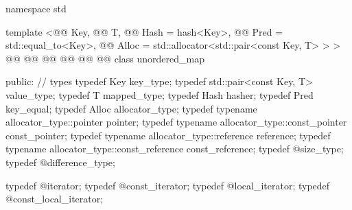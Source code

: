 \documentclass[american,twoside]{book}
\begin{document}
%
\begin{codeblock}
namespace std {
  template <@@ Key,
            @@ T,
            @@ Hash = hash<Key>,
            @@ Pred = std::equal_to<Key>,
            @@ Alloc = std::allocator<std::pair<const Key, T> > >
  @@
           @@
           @@
           @@
           @@
           @@
  class unordered_map
  {
  public:
    // types
    typedef Key                                      key_type;
    typedef std::pair<const Key, T>                  value_type;
    typedef T                                        mapped_type;
    typedef Hash                                     hasher;
    typedef Pred                                     key_equal;
    typedef Alloc                                    allocator_type;
    typedef typename allocator_type::pointer         pointer;
    typedef typename allocator_type::const_pointer   const_pointer;
    typedef typename allocator_type::reference       reference;
    typedef typename allocator_type::const_reference const_reference;
    typedef @\impdef@                   size_type;
    typedef @\impdef@                   difference_type;

    typedef @\impdef@                   iterator;
    typedef @\impdef@                   const_iterator;
    typedef @\impdef@                   local_iterator;
    typedef @\impdef@                   const_local_iterator;

}}
\end{codeblock}
\end{document}
